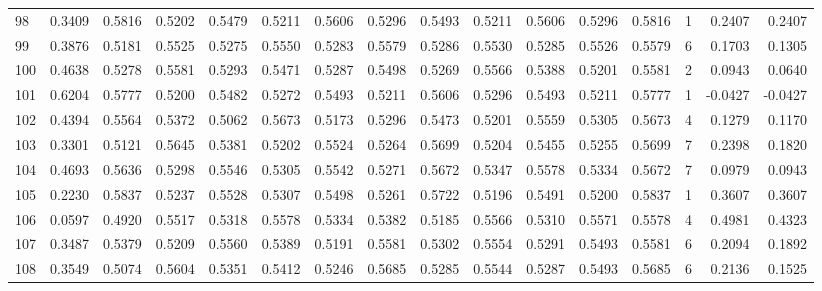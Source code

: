 \begin{tabular}{lrrrrrrrrrrrrrrr}
98  &      0.3409 &  0.5816 &  0.5202 &  0.5479 &  0.5211 &  0.5606 &  0.5296 &  0.5493 &  0.5211 &  0.5606 &   0.5296 &     0.5816 &      1 &                    0.2407 &                     0.2407 \\
99  &      0.3876 &  0.5181 &  0.5525 &  0.5275 &  0.5550 &  0.5283 &  0.5579 &  0.5286 &  0.5530 &  0.5285 &   0.5526 &     0.5579 &      6 &                    0.1703 &                     0.1305 \\
100 &      0.4638 &  0.5278 &  0.5581 &  0.5293 &  0.5471 &  0.5287 &  0.5498 &  0.5269 &  0.5566 &  0.5388 &   0.5201 &     0.5581 &      2 &                    0.0943 &                     0.0640 \\
101 &      0.6204 &  0.5777 &  0.5200 &  0.5482 &  0.5272 &  0.5493 &  0.5211 &  0.5606 &  0.5296 &  0.5493 &   0.5211 &     0.5777 &      1 &                   -0.0427 &                    -0.0427 \\
102 &      0.4394 &  0.5564 &  0.5372 &  0.5062 &  0.5673 &  0.5173 &  0.5296 &  0.5473 &  0.5201 &  0.5559 &   0.5305 &     0.5673 &      4 &                    0.1279 &                     0.1170 \\
103 &      0.3301 &  0.5121 &  0.5645 &  0.5381 &  0.5202 &  0.5524 &  0.5264 &  0.5699 &  0.5204 &  0.5455 &   0.5255 &     0.5699 &      7 &                    0.2398 &                     0.1820 \\
104 &      0.4693 &  0.5636 &  0.5298 &  0.5546 &  0.5305 &  0.5542 &  0.5271 &  0.5672 &  0.5347 &  0.5578 &   0.5334 &     0.5672 &      7 &                    0.0979 &                     0.0943 \\
105 &      0.2230 &  0.5837 &  0.5237 &  0.5528 &  0.5307 &  0.5498 &  0.5261 &  0.5722 &  0.5196 &  0.5491 &   0.5200 &     0.5837 &      1 &                    0.3607 &                     0.3607 \\
106 &      0.0597 &  0.4920 &  0.5517 &  0.5318 &  0.5578 &  0.5334 &  0.5382 &  0.5185 &  0.5566 &  0.5310 &   0.5571 &     0.5578 &      4 &                    0.4981 &                     0.4323 \\
107 &      0.3487 &  0.5379 &  0.5209 &  0.5560 &  0.5389 &  0.5191 &  0.5581 &  0.5302 &  0.5554 &  0.5291 &   0.5493 &     0.5581 &      6 &                    0.2094 &                     0.1892 \\
108 &      0.3549 &  0.5074 &  0.5604 &  0.5351 &  0.5412 &  0.5246 &  0.5685 &  0.5285 &  0.5544 &  0.5287 &   0.5493 &     0.5685 &      6 &                    0.2136 &                     0.1525 \\

\end{tabular}

